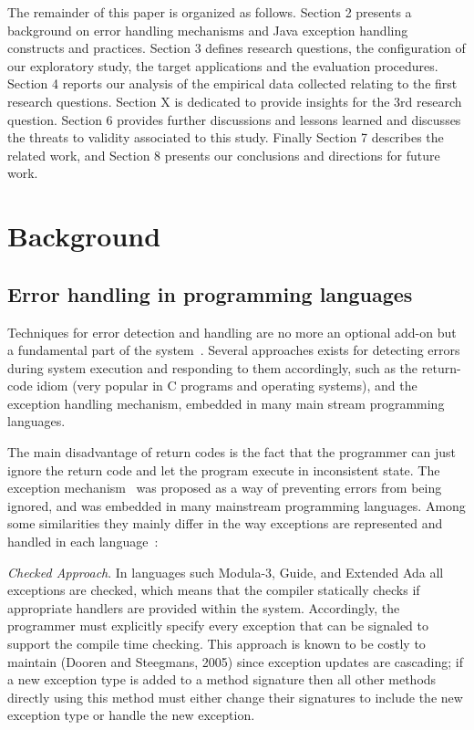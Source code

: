\documentclass[conference]{IEEEtran}
\begin{document}
The remainder of this paper is organized as follows. Section 2 presents a
background on error handling mechanisms and Java exception handling constructs
and practices. Section 3 defines research questions, the configuration of our
exploratory study, the target applications and the evaluation procedures.
Section 4 reports our analysis of the empirical data collected relating to the
first research questions. Section X is dedicated to provide insights for the 3rd
research question. Section 6 provides further discussions and lessons learned
and discusses the threats to validity associated to this study. Finally Section
7 describes the related work, and Section 8 presents our conclusions and
directions for future work.


\section{Background}

\subsection{Error handling in programming languages}

Techniques for error detection and handling are no more an optional add-on but a
fundamental part of the system~\cite{bruntink2006discovering}. Several
approaches exists for detecting errors during system execution and responding to
them accordingly, such as the return-code idiom (very popular in C programs and
operating systems), and the exception handling mechanism, embedded in many main
stream programming languages.

The main disadvantage of return codes is the fact that the programmer can just
ignore the return code and let the program execute in inconsistent state. The
exception mechanism~\cite{goodenough1975exception} was proposed as a way of
preventing errors from being ignored, and was embedded in many mainstream
programming languages. Among some similarities they mainly differ in the way
exceptions are represented and handled in each
language~\cite{garcia2001comparative}:

\noindent\emph{Checked Approach}. In languages such Modula-3, Guide, and
Extended Ada all exceptions are checked, which means that the compiler
statically checks if appropriate handlers are provided within the system.
Accordingly, the programmer must explicitly specify every exception that can be
signaled to support the compile time checking. This approach is known to be
costly to maintain (Dooren and Steegmans, 2005) since exception updates are
cascading; if a new exception type is added to a method signature then all other
methods directly using this method must either change their signatures to
include the new exception type or handle the new exception.
\end{document}
